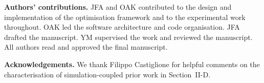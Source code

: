 \documentclass[conference]{IEEEtran}
\begin{document}
\textbf{Authors' contributions.} JFA and OAK contributed to the design and implementation of the optimisation framework and to the experimental work throughout. OAK led the software architecture and code organisation. JFA drafted the manuscript. YM supervised the work and reviewed the manuscript. All authors read and approved the final manuscript.

\textbf{Acknowledgements.} We thank Filippo Castiglione for helpful comments on the characterisation of simulation-coupled prior work in Section~II-D.



\end{document}
